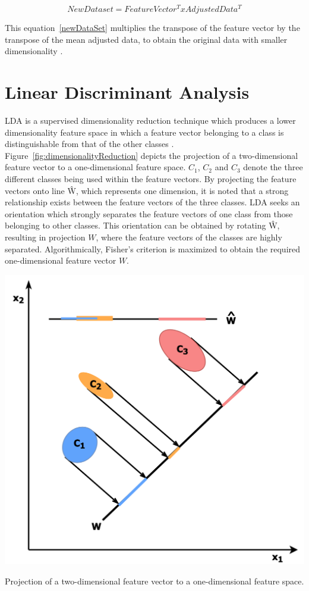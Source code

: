 \begin{equation}\label{newDataSet}
	New Dataset = FeatureVector^T x AdjustedData^T 
	\end{equation}

This equation~\ref{newDataSet} multiplies the transpose of the feature vector by the transpose of the mean adjusted data, to obtain the original data with smaller dimensionality \citep{jackson2005user}.

\section{Linear Discriminant Analysis }

LDA is a supervised dimensionality reduction technique which produces a lower dimensionality feature space in which a feature vector belonging to a class is distinguishable from that of the other classes \citep{Sharma2015}. Figure~\ref{fig:dimensionalityReduction} depicts the projection of a two-dimensional feature vector to a one-dimensional feature space. $C_1$, $C_2$ and $C_3$ denote the three different classes being used within the feature vectors. By projecting the feature vectors onto line \^{W}, which represents one dimension, it is noted that a strong relationship exists between the feature vectors of the three classes. LDA seeks an orientation which strongly separates the feature vectors of one class from those belonging to other classes. This orientation can be obtained by rotating \^{W}, resulting in projection $W$, where the feature vectors of the classes are highly separated. Algorithmically, Fisher's criterion is maximized to obtain the required one-dimensional feature vector $W$. 

\begin{marginfigure}
	\includegraphics{graphics/dimensionality_reduction/DimensionalityReductionLDA.png}
	\caption{
		Projection of a two-dimensional feature vector to a one-dimensional feature space. 
	}
	\label{fig:dimensionalityReduction}
  \end{marginfigure}

